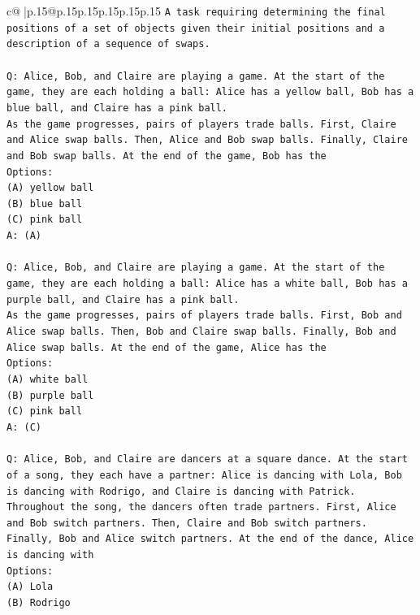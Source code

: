 \documentclass{article}
\begin{document}
{\begin{supertabular}{c@{$\;$}|p{.15\linewidth}@{}p{.15\linewidth}p{.15\linewidth}p{.15\linewidth}p{.15\linewidth}p{.15\linewidth}}
{{{\texttt{A task requiring determining the final positions of a set of objects given their initial positions and a description of a sequence of swaps.} \\
\\ 
\texttt{Q: Alice, Bob, and Claire are playing a game. At the start of the game, they are each holding a ball: Alice has a yellow ball, Bob has a blue ball, and Claire has a pink ball.} \\
\texttt{As the game progresses, pairs of players trade balls. First, Claire and Alice swap balls. Then, Alice and Bob swap balls. Finally, Claire and Bob swap balls. At the end of the game, Bob has the} \\
\texttt{Options:} \\
\texttt{(A) yellow ball} \\
\texttt{(B) blue ball} \\
\texttt{(C) pink ball} \\
\texttt{A: (A)} \\
\\ 
\texttt{Q: Alice, Bob, and Claire are playing a game. At the start of the game, they are each holding a ball: Alice has a white ball, Bob has a purple ball, and Claire has a pink ball.} \\
\texttt{As the game progresses, pairs of players trade balls. First, Bob and Alice swap balls. Then, Bob and Claire swap balls. Finally, Bob and Alice swap balls. At the end of the game, Alice has the} \\
\texttt{Options:} \\
\texttt{(A) white ball} \\
\texttt{(B) purple ball} \\
\texttt{(C) pink ball} \\
\texttt{A: (C)} \\
\\ 
\texttt{Q: Alice, Bob, and Claire are dancers at a square dance. At the start of a song, they each have a partner: Alice is dancing with Lola, Bob is dancing with Rodrigo, and Claire is dancing with Patrick.} \\
\texttt{Throughout the song, the dancers often trade partners. First, Alice and Bob switch partners. Then, Claire and Bob switch partners. Finally, Bob and Alice switch partners. At the end of the dance, Alice is dancing with} \\
\texttt{Options:} \\
\texttt{(A) Lola} \\
\texttt{(B) Rodrigo} \\
}}}
\end{supertabular}}
\end{document}
